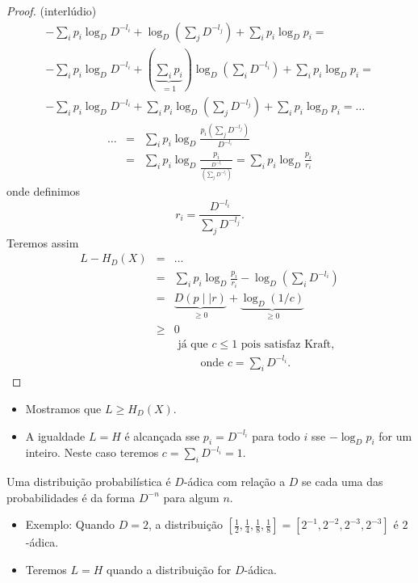 \begin{frame}[allowframebreaks]
\begin{proof}
  \proofbreak
  {\scriptsize (interlúdio)}
  \vspace{-0.6cm}
  \begin{eqnarray}
  - \sum_i p_i \log_D D^{-l_i} + \log_D \left( \sum_j D^{-l_j} \right) +  \sum_i p_i \log_D p_i = \nonumber \\
  - \sum_i p_i \log_D D^{-l_i} + \left( \underbrace{ \sum_i p_i }_{=1} \right) \log_D \left( \sum_i D^{-l_i} \right) + \sum_i p_i \log_D p_i = \nonumber \\
  - \sum_i p_i \log_D D^{-l_i} + \sum_i p_i \log_D \left( \sum_j D^{-l_j} \right) + \sum_i p_i \log_D p_i = \ldots
  \end{eqnarray}
  \proofbreak
  \begin{eqnarray}
  \ldots &=&  \sum_i p_i \log_D \frac{p_i \left( \sum_j D^{-l_j} \right)}{D^{-l_i}} \nonumber \\
   	&=&  \sum_i p_i \log_D \frac{p_i}{\frac{D^{-l_i}}{\left( \sum_j D^{-l_j} \right)}} = \sum_i p_i \log_D \frac{p_i}{r_i}
  \end{eqnarray}
  onde definimos 
	\begin{equation}
	r_i = \frac{D^{-l_i}}{\sum_j D^{-l_j}} .
	\end{equation}
  \proofbreak
  Teremos assim
  \vspace{-0.3cm}
  \begin{eqnarray}
  L - H_D (X) &=& \ldots \nonumber \\
		&=& \sum_i p_i \log_D \frac{p_i}{r_i} - \log_D \left( \sum_i D^{-l_i} \right) \nonumber \\
		&=& \underbrace{D(p \mid\mid r)}_{ \geq 0} + \underbrace{\log_D (1/c)}_{ \geq 0} \nonumber \\
		&\geq& 0 \\
		&& \text{ já que } c \leq 1 \text{ pois satisfaz Kraft, } \nonumber \\
		&& \quad \quad \text{ onde } c = \sum_i D^{-l_i}. \nonumber
  \end{eqnarray}
  \end{proof}

  \begin{itemize}
  \item Mostramos que $L \geq H_D (X)$.
  \item A igualdade $L=H$ é alcançada sse $p_i = D^{-l_i}$ para todo $i$ sse $-\log_D p_i$ for um inteiro. Neste caso 
	teremos $c = \sum_i D^{-l_i} = 1$.
  \end{itemize}

  \begin{definition}[$D$-ádico]
  Uma distribuição probabilística é $D$-ádica com relação a $D$ se cada uma das probabilidades é da forma $D^{-n}$
  para algum $n$.
  \end{definition}
  \begin{itemize}
  \item Exemplo: Quando $D=2$, a distribuição $\left[ \frac{1}{2}, \frac{1}{4}, \frac{1}{8}, \frac{1}{8} \right] = [2^{-1}, 2^{-2}, 2^{-3}, 2^{-3}]$ é $2$-ádica.
  \item Teremos $L=H$ quando a distribuição for $D$-ádica.
  \end{itemize}
\end{frame}

